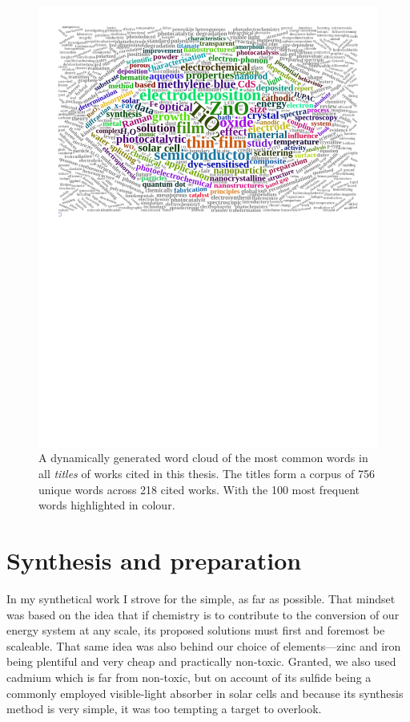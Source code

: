 \documentclass[webedition,openright,titles,swedish,english]{LuaUUThesis}\usepackage[]{graphicx}\usepackage[]{xcolor}
\begin{document}
\begin{figure}[tbp]
\centering
\includegraphics[trim={1.2cm 14.9cm 1.2cm 1.2cm},clip,width=4.72in]{0100-fig-bcf-titlewords}
\caption[Word cloud of all titles in the bibliography]{%
   A dynamically generated word cloud of the most common words in all
   \emph{titles} of works cited in this thesis.
   The titles form a corpus of \num{756} unique words across
   \num{218} cited works.
   With the \num{100} most frequent words highlighted in colour.}
\label{fig:0100-wordcloud-thesis-corpus}
\end{figure}






\chapter{Synthesis and preparation}
\label{ch:synthesis}


In my synthetical work I strove for the simple, as far as possible.
That mindset was based on the idea that if chemistry is to contribute to the
conversion of our energy system at any scale, its proposed solutions must
first and foremost be scaleable.
That same idea was also behind our choice of elements---zinc and iron being
plentiful and very cheap and practically non-toxic.
Granted, we also used cadmium which is far from non-toxic, but on account of
its sulfide being a commonly employed visible-light absorber in solar cells and because
its synthesis method is very simple, it was too tempting a target to overlook.
\end{document}
